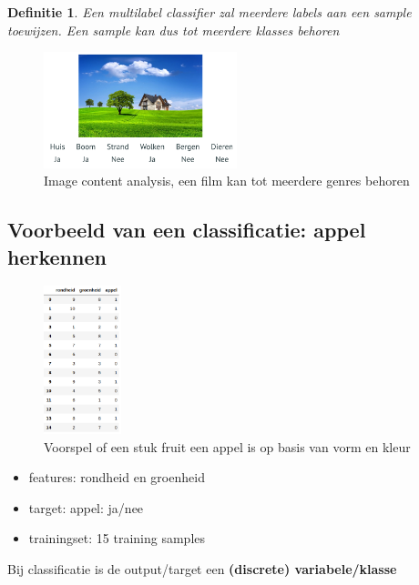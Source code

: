 \documentclass{article}
\newtheorem{theorem}{Definitie}[section]
\begin{document}
\begin{theorem}
    Een multilabel classifier zal meerdere labels aan een sample toewijzen.
    Een sample kan dus tot meerdere klasses behoren
\end{theorem}

\begin{figure}[H]
    \centering
    \includegraphics[width=0.5\textwidth]{multilabel-classifier.png}
    \caption{Image content analysis, een film kan tot meerdere genres behoren}
\end{figure}

\subsection{Voorbeeld van een classificatie: appel herkennen}

\begin{figure}[H]
    \centering
    \includegraphics[width=0.2\textwidth]{multilabel-classifier2.png}
    \caption{Voorspel of een stuk fruit een appel is op basis van vorm en kleur}
\end{figure}

\begin{itemize}
    \item features: rondheid en groenheid
    \item target: appel: ja/nee
    \item trainingset: 15 training samples
\end{itemize}

Bij classificatie is de output/target een \textbf{(discrete) variabele/klasse}
\end{document}
